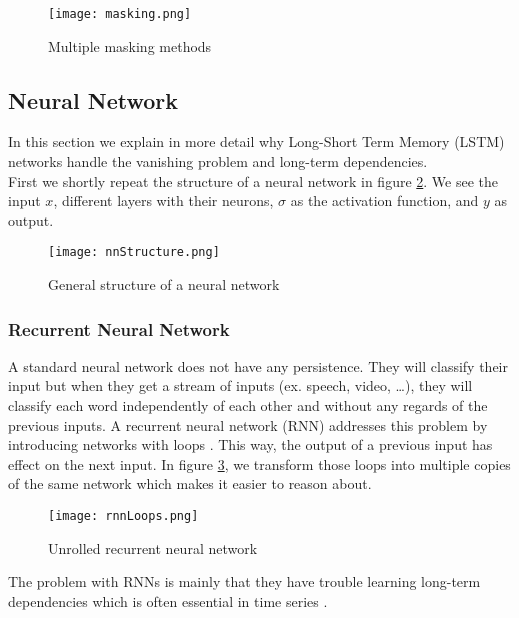 \begin{figure}[!htb]
	\centering
	\texttt{[image: masking.png]}
	\caption{Multiple masking methods \cite{dl4jRnn:online}}
	\label{fig:masking}
\end{figure} 


\subsection{Neural Network}
\label{sec:nn}

In this section we explain in more detail why Long-Short Term Memory (LSTM) \cite{lstmOrginin:article} networks handle the vanishing problem and long-term dependencies. \\

First we shortly repeat the structure of a neural network in figure \ref{fig:nnStructure}. We see the input $x$, different layers with their neurons, $\sigma$ as the activation function, and $y$ as output. 

\begin{figure}[!htb]
	\centering
	\texttt{[image: nnStructure.png]}
	\caption{General structure of a neural network \cite{IMECJaak}}
	\label{fig:nnStructure}
\end{figure} 

\subsubsection{Recurrent Neural Network}
\label{sec:rnn}

A standard neural network does not have any persistence. They will classify their input but when they get a stream of inputs (ex. speech, video, \ldots), they will classify each word independently of each other and without any regards of the previous inputs. A recurrent neural network (RNN) addresses this problem by introducing networks with loops \cite{rnnOrigin:article}. This way, the output of a previous input has effect on the next input. In figure \ref{fig:rnnLoops}, we transform those loops into multiple copies of the same network which makes it easier to reason about. \\

\begin{figure}[!htb]
	\centering
	\texttt{[image: rnnLoops.png]}
	\caption{Unrolled recurrent neural network \cite{IMECJaak}}
	\label{fig:rnnLoops}
\end{figure} 

The problem with RNNs is mainly that they have trouble learning long-term dependencies which is often essential in time series \cite{longDepRNN:article}.


